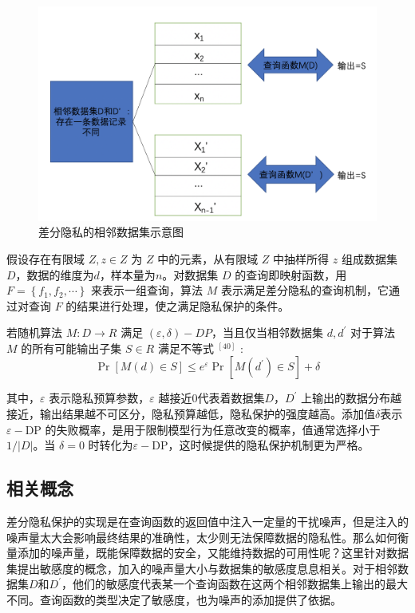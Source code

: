 \begin{figure}[!hbt]
\centering
	\includegraphics[scale=0.6]{fig2/C2/相邻数据集示意图}%
	\caption{差分隐私的相邻数据集示意图}
	\label{fig:相邻数据集示意图}	
\end{figure}

假设存在有限域 $Z,z \in Z$ 为 $Z$ 中的元素，从有限域 $Z$ 中抽样所得 $z$ 组成数据集 $D$，数据的维度为$d$，样本量为$n$。对数据集 $D$ 的查询即映射函数，用 $F=\left\{f_{1}, f_{2}, \cdots\right\}$ 来表示一组查询，算法 $M$ 表示满足差分隐私的查询机制，它通过对查询 $F$ 的结果进行处理，使之满足隐私保护的条件。

\begin{define}[差分隐私成立条件]\label{差分隐私成立条件}

若随机算法 $M: D \rightarrow R$ 满足 $(\varepsilon, \delta)-D P$，当且仅当相邻数据集 $d, d^{\prime}$ 对于算法 $M$ 的所有可能输出子集 $S \in R$ 满足不等式 $^{[40]}$ :
$$
\operatorname{Pr}[M(d) \in S] \leq e^{\varepsilon} \operatorname{Pr}\left[M\left(d^{\prime}\right) \in S\right]+\delta
$$
\end{define}
其中，$\varepsilon$ 表示隐私预算参数，$\varepsilon$ 越接近0代表着数据集$D$，$D^{\prime}$ 上输出的数据分布越接近，输出结果越不可区分，隐私预算越低，隐私保护的强度越高。添加值$\delta$表示$\varepsilon-\mathrm{DP}$ 的失败概率，是用于限制模型行为任意改变的概率，值通常选择小于 $1 /|D|$。当 $\delta=0$ 时转化为$\varepsilon-\mathrm{DP}$，这时候提供的隐私保护机制更为严格。


\subsection{相关概念}
差分隐私保护的实现是在查询函数的返回值中注入一定量的干扰噪声，但是注入的噪声量太大会影响最终结果的准确性，太少则无法保障数据的隐私性。那么如何衡量添加的噪声量，既能保障数据的安全，又能维持数据的可用性呢？这里针对数据集提出敏感度的概念，加入的噪声量大小与数据集的敏感度息息相关。对于相邻数据集$D$和$D^{\prime}$，他们的敏感度代表某一个查询函数在这两个相邻数据集上输出的最大不同。查询函数的类型决定了敏感度，也为噪声的添加提供了依据。


